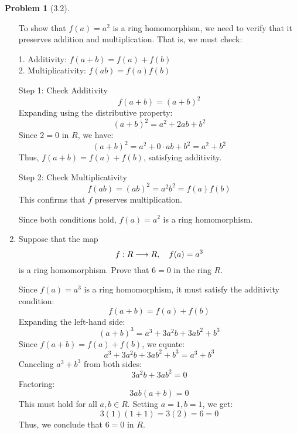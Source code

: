 \documentclass[12pt]{article}
\theoremstyle{definition}
\newtheorem{problem}{Problem}
\begin{document}
\begin{problem}[3.2]
\begin{enumerate}[label=(\alph*)]
              \begin{solution}
                To show that \( f(a) = a^2 \) is a ring homomorphism, we need to verify that it preserves addition and multiplication. That is, we must check:

                1. Additivity: \( f(a + b) = f(a) + f(b) \)  \\
                2. Multiplicativity: \( f(a b) = f(a) f(b) \)
  
                Step 1: Check Additivity
                \[
                    f(a + b) = (a + b)^2
                \]
                Expanding using the distributive property:
                \[
                    (a + b)^2 = a^2 + 2ab + b^2
                \]
                Since \( 2 = 0 \) in \( R \), we have:
                \[
                    (a + b)^2 = a^2 + 0 \cdot ab + b^2 = a^2 + b^2
                \]
                Thus, \( f(a + b) = f(a) + f(b) \), satisfying additivity.
  
                Step 2: Check Multiplicativity
                \[
                    f(a b) = (a b)^2 = a^2 b^2 = f(a) f(b)
                \]
                This confirms that \( f \) preserves multiplication.
  
                Since both conditions hold, \( f(a) = a^2 \) is a ring homomorphism.
              \end{solution}
        \item Suppose that the map
              \[
                  f : R \longrightarrow R, \hspace{10px} f(a) = a^3
              \]
              is a ring homomorphism. Prove that $6 = 0$ in the ring $R$.

              \begin{solution}
                Since \( f(a) = a^3 \) is a ring homomorphism, it must satisfy the additivity condition:
                \[
                    f(a + b) = f(a) + f(b)
                \]
                Expanding the left-hand side:
                \[
                    (a + b)^3 = a^3 + 3a^2b + 3ab^2 + b^3
                \]
                Since \( f(a + b) = f(a) + f(b) \), we equate:
                \[
                    a^3 + 3a^2b + 3ab^2 + b^3 = a^3 + b^3
                \]
                Canceling \( a^3 + b^3 \) from both sides:
                \[
                    3a^2b + 3ab^2 = 0
                \]
                Factoring:
                \[
                    3ab(a + b) = 0
                \]
                This must hold for all \( a, b \in R \). Setting \( a = 1, b = 1 \), we get:
                \[
                    3(1)(1 + 1) = 3(2) = 6 = 0
                \]
                Thus, we conclude that \( 6 = 0 \) in \( R \).
              \end{solution}
    \end{enumerate}
\end{problem}
\end{document}

